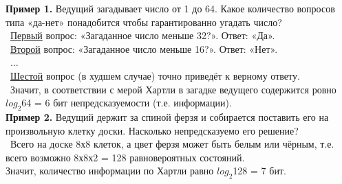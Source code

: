 \newpage
\rhead{\textbf{\textcolor{blue}{П}\textcolor{gray}{ример применения меры Харти на практике}}}
\vspace*{2mm}
\newline
\small{
\textbf{Пример 1.} Ведущий загадывает число от 1 до 64. Какое количество вопросов типа «да-нет» понадобится чтобы гарантированно угадать число?\\
\textbullet \ \underline{Первый} вопрос: «Загаданное число меньше 32?». Ответ: «Да». \\
\textbullet \ \underline{Второй} вопрос: «Загаданное число меньше 16?». Ответ: «Нет».\\
\textbullet \ $\ldots$\\
\textbullet \ \underline{Шестой} вопрос (в худшем случае) точно приведёт к верному ответу. \\
\textbullet \ Значит, в соответствии с мерой Хартли в загадке ведущего содержится ровно $log_2$64 = 6 бит непредсказуемости (т.е. информации).\\
\vspace*{2mm}
\textbf{Пример 2.} Ведущий держит за спиной ферзя и собирается поставить его на произвольную клетку доски. Насколько непредсказуемо его решение?\\
\textbullet \ Всего на доске 8х8 клеток, а цвет ферзя может быть белым или чёрным, т.е. всего возможно 8х8х2 = 128 равновероятных состояний.\\
\textbullet Значит, количество информации по Хартли равно $log_2$128 = 7 бит.\
}